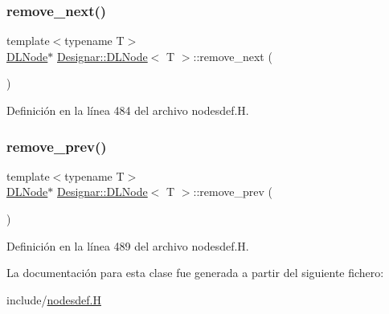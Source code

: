 \subsubsection{\texorpdfstring{remove\+\_\+next()}{remove\_next()}}
{\footnotesize\ttfamily template$<$typename T$>$ \\
\hyperlink{class_designar_1_1_d_l_node}{D\+L\+Node}$\ast$ \hyperlink{class_designar_1_1_d_l_node}{Designar\+::\+D\+L\+Node}$<$ T $>$\+::remove\+\_\+next (\begin{DoxyParamCaption}{ }\end{DoxyParamCaption})\hspace{0.3cm}{\ttfamily [inline]}}



Definición en la línea 484 del archivo nodesdef.\+H.

\mbox{\label{class_designar_1_1_d_l_node_a0bd2bf491ab61ab3fd1eb6b8b06dcae5}} 
\subsubsection{\texorpdfstring{remove\+\_\+prev()}{remove\_prev()}}
{\footnotesize\ttfamily template$<$typename T$>$ \\
\hyperlink{class_designar_1_1_d_l_node}{D\+L\+Node}$\ast$ \hyperlink{class_designar_1_1_d_l_node}{Designar\+::\+D\+L\+Node}$<$ T $>$\+::remove\+\_\+prev (\begin{DoxyParamCaption}{ }\end{DoxyParamCaption})\hspace{0.3cm}{\ttfamily [inline]}}



Definición en la línea 489 del archivo nodesdef.\+H.



La documentación para esta clase fue generada a partir del siguiente fichero\+:\begin{DoxyCompactItemize}
\item 
include/\hyperlink{nodesdef_8_h}{nodesdef.\+H}\end{DoxyCompactItemize}
